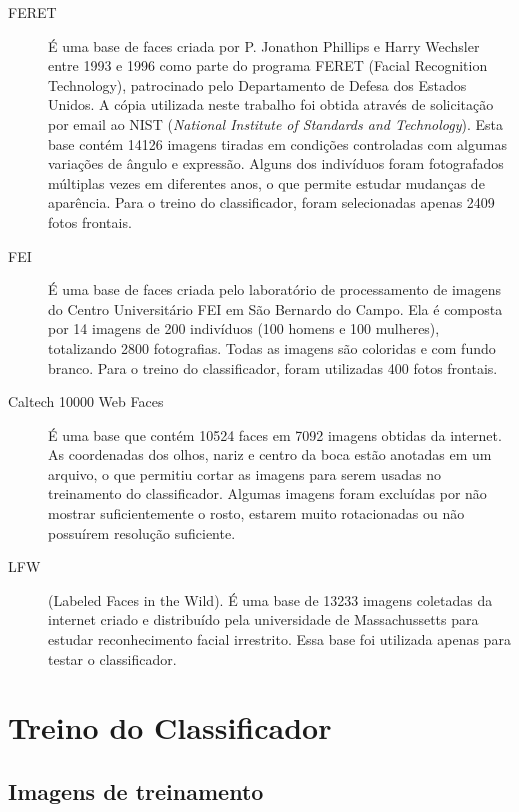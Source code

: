 \begin{description}
\item [FERET] 
É uma base de faces criada por P. Jonathon Phillips e Harry Wechsler entre 1993 e 1996 como parte do programa FERET (Facial Recognition Technology), patrocinado pelo Departamento de Defesa dos Estados Unidos.
A cópia utilizada neste trabalho foi obtida através de solicitação por email ao NIST (\textit{National Institute of Standards and Technology}).
Esta base contém 14126 imagens tiradas em condições controladas com algumas variações de ângulo e expressão.
Alguns dos indivíduos foram fotografados múltiplas vezes em diferentes anos, o que permite estudar mudanças de aparência.
Para o treino do classificador, foram selecionadas apenas 2409 fotos frontais.

\item [FEI] 
É uma base de faces criada pelo laboratório de processamento de imagens do Centro Universitário FEI em São Bernardo do Campo. Ela é composta por 14 imagens de 200 indivíduos (100 homens e 100 mulheres), totalizando 2800 fotografias. Todas as imagens são coloridas e com fundo branco.
Para o treino do classificador, foram utilizadas 400 fotos frontais.

\item [Caltech 10000 Web Faces] 
É uma base que contém 10524 faces em 7092 imagens obtidas da internet. As coordenadas dos olhos, nariz e centro da boca estão anotadas em um arquivo, o que permitiu cortar as imagens para serem usadas no treinamento do classificador. Algumas imagens foram excluídas por não mostrar suficientemente o rosto, estarem muito rotacionadas ou não possuírem resolução suficiente.

\item [LFW] 
(Labeled Faces in the Wild). É uma base de 13233 imagens coletadas da internet criado e distribuído pela universidade de Massachussetts para estudar reconhecimento facial irrestrito.
Essa base foi utilizada apenas para testar o classificador.
\end{description}


\section{Treino do Classificador}\label{sec:treino_classificador}

\subsection{Imagens de treinamento}\label{sec:imagens_de_treino}

